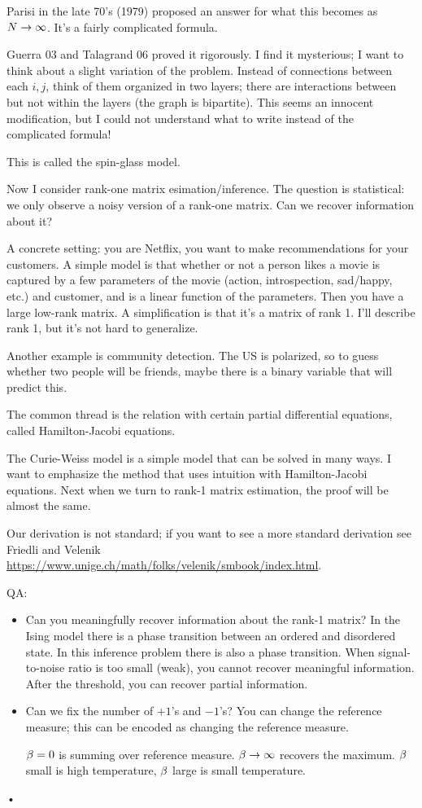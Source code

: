 Parisi in the late 70's (1979) proposed an answer for what this becomes as $N\to \infty$. It's a fairly complicated formula. 

Guerra 03 and Talagrand 06 proved it rigorously. I find it mysterious; I want to think about a slight variation of the problem. Instead of connections between each $i,j$, think of them organized in two layers; there are interactions between but not within the layers (the graph is bipartite). 
This seems an innocent modification, but I could not understand what to write instead of the complicated formula! %

This is called the spin-glass model.

Now I consider rank-one matrix esimation/inference. The question is statistical: we only observe a noisy version of a rank-one matrix. Can we recover information about it?

A concrete setting: you are Netflix, you want to make recommendations for your customers. A simple model is that whether or not a person likes a movie is captured by a few parameters of the movie (action, introspection, sad/happy, etc.) and customer, and is a linear function of the parameters. Then you have a large low-rank matrix. A simplification is that it's a matrix of rank 1. I'll describe rank 1, but it's not hard to generalize. 

Another example is community detection. The US is polarized, so to guess whether two people will be friends, maybe there is a binary variable that will predict this.

The common thread is the relation with certain partial differential equations, called Hamilton-Jacobi equations.

The Curie-Weiss model is a simple model that can be solved in many ways. I want to emphasize the method that uses intuition with Hamilton-Jacobi equations. Next when we turn to rank-1 matrix estimation, the proof will be almost the same. 

Our derivation is not standard; if you want to see a more standard derivation see Friedli and Velenik \url{https://www.unige.ch/math/folks/velenik/smbook/index.html}.

QA:
\begin{itemize}
\item
Can you meaningfully recover information about the rank-1 matrix? In the Ising model there is a phase transition between an ordered and disordered state. In this inference problem there is also a phase transition. When signal-to-noise ratio is too small (weak), you cannot recover meaningful information. After the threshold, you can recover partial information. 
\item
Can we fix the number of $+1$'s and $-1$'s? You can change the reference measure; this can be encoded as changing the reference measure.

$\beta=0$ is summing over reference measure. $\beta\to \infty$ recovers the maximum. $\beta$ small is high temperature, $\beta$ large is small temperature.
\end{itemize}•

